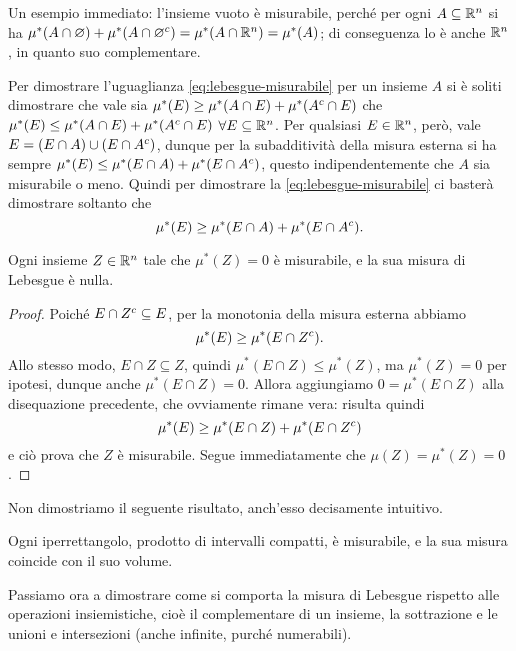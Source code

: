 Un esempio immediato: l'insieme vuoto è misurabile, perch\'e per ogni $A\subseteq\mathbb{R}^n$ si ha $\mu^*(A\cap\varnothing)+\mu^*(A\cap{\varnothing}^c)=\mu^*(A\cap\mathbb{R}^n)=\mu^*(A)$; di conseguenza lo è anche $\mathbb{R}^n$, in quanto suo complementare.
\begin{osservazione}
	Per dimostrare l'uguaglianza \eqref{eq:lebesgue-misurabile} per un insieme $A$ si è soliti dimostrare che vale sia $\mu^*(E)\geq\mu^*(A\cap E)+\mu^*({A}^c\cap E)$ che $\mu^*(E)\leq\mu^*(A\cap E)+\mu^*({A}^c\cap E)$ $\forall E\subseteq\mathbb{R}^n$.
	Per qualsiasi $E\in\mathbb{R}^n$, però, vale $E=(E\cap A)\cup(E\cap{A}^c)$, dunque per la subadditività della misura esterna si ha sempre $\mu^*(E)\leq\mu^*(E\cap A)+\mu^*(E\cap{A}^c)$, questo indipendentemente che $A$ sia misurabile o meno.
	Quindi per dimostrare la \eqref{eq:lebesgue-misurabile}  ci basterà dimostrare soltanto che
	\begin{equation}
		\mu^*(E)\geq\mu^*(E\cap A)+\mu^*(E\cap{A}^c).
	\end{equation}
\end{osservazione}
\begin{proprieta} \label{pr:misura-nulla}
	Ogni insieme $Z\in\mathbb{R}^n$ tale che $\mu^*(Z)=0$ è misurabile, e la sua misura di Lebesgue è nulla.
\end{proprieta}
\begin{proof}
	Poich\'e $E\cap{Z}^c\subseteq E$, per la monotonia della misura esterna abbiamo
	\begin{equation}
		\mu^*(E)\geq\mu^*(E\cap{Z}^c).
	\end{equation}
	Allo stesso modo, $E\cap Z\subseteq Z$, quindi $\mu^*(E\cap Z)\leq\mu^*(Z)$, ma $\mu^*(Z)=0$ per ipotesi, dunque anche $\mu^*(E\cap Z)=0$.
	Allora aggiungiamo $0=\mu^*(E\cap Z)$ alla disequazione precedente, che ovviamente rimane vera: risulta quindi
	\begin{equation}
		\mu^*(E)\geq\mu^*(E\cap Z)+\mu^*(E\cap{Z}^c)
	\end{equation}
	e ciò prova che $Z$ è misurabile.
	Segue immediatamente che $\mu(Z)=\mu^*(Z)=0$.
\end{proof}
Non dimostriamo il seguente risultato, anch'esso decisamente intuitivo.
\begin{proprieta} \label{pr:misura-iperrettangolo}
	Ogni iperrettangolo, prodotto di intervalli compatti, è misurabile, e la sua misura coincide con il suo volume.
\end{proprieta}
Passiamo ora a dimostrare come si comporta la misura di Lebesgue rispetto alle operazioni insiemistiche, cioè il complementare di un insieme, la sottrazione e le unioni e intersezioni (anche infinite, purch\'e numerabili).
